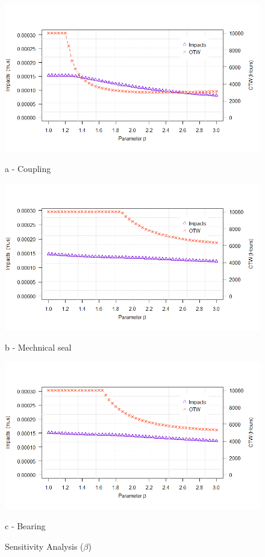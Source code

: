 \begin{figure}[!htb]
	\begin{minipage}[b]{0.5\linewidth}
		\centering
		\includegraphics[width=\textwidth]{figures/ch05_fig_sabeta_coupling}
		\caption*{a - Coupling}
	\end{minipage}
	\hspace{0.05cm}
	\begin{minipage}[b]{0.5\linewidth}
		\centering
		\includegraphics[width=\textwidth]{figures/ch05_fig_sabeta_mechseal}
		\caption*{b - Mechnical seal}
	\end{minipage}
	\hspace{0.05cm}
	\begin{minipage}[b]{0.5\linewidth}
		\centering
		\includegraphics[width=\textwidth]{figures/ch05_fig_sabeta_bearing}
		\caption*{c - Bearing}
	\end{minipage}
	\caption{Sensitivity Analysis ($\beta$)}
	\label{ch05_fig_sa_beta}
\end{figure}